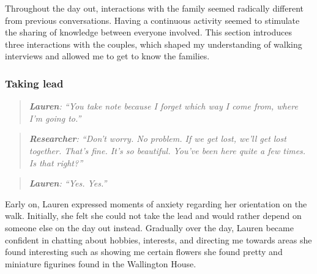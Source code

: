 Throughout the day out, interactions with the family seemed radically different from previous conversations. Having a continuous activity seemed to stimulate the sharing of knowledge between everyone involved. This section introduces three interactions with the couples, which shaped my understanding of walking interviews and allowed me to get to know the families.


\subsubsection{Taking lead}
\begin{quote}
\textit{   \textbf{Lauren}: ``You take note because I forget which way I come from, where I'm going to.''
}\end{quote}

\begin{quote}    
\textit{    \textbf{Researcher}: ``Don't worry. No problem. If we get lost, we'll get lost together. That's fine. It's so beautiful. You've been here quite a few times. Is that right?''
}    \end{quote}
    \begin{quote}    

\textit{    \textbf{Lauren}: ``Yes. Yes.''
}\end{quote}

Early on, Lauren expressed moments of anxiety regarding her orientation on the walk. Initially, she felt she could not take the lead and would rather depend on someone else on the day out instead. Gradually over the day, Lauren became confident in chatting about hobbies, interests, and directing me towards areas she found interesting such as showing me certain flowers she found pretty and miniature figurines found in the Wallington House.

